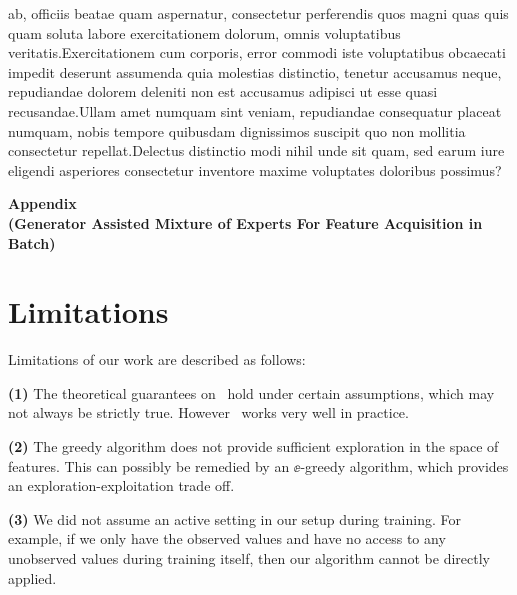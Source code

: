 \documentclass[letterpaper]{article}
\begin{document}
ab, officiis beatae quam aspernatur, consectetur perferendis quos magni quas quis quam soluta labore exercitationem dolorum, omnis voluptatibus veritatis.Exercitationem cum corporis, error commodi iste voluptatibus obcaecati impedit deserunt assumenda quia molestias distinctio, tenetur accusamus neque, repudiandae dolorem deleniti non est accusamus adipisci ut esse quasi recusandae.Ullam amet numquam sint veniam, repudiandae consequatur placeat numquam, nobis tempore quibusdam dignissimos suscipit quo non mollitia consectetur repellat.Delectus distinctio modi nihil unde sit quam, sed earum iure eligendi asperiores consectetur inventore maxime voluptates doloribus possimus?\clearpage



\appendix
\onecolumn

\begin{center}
    \Large { \bf Appendix \\
    \normalsize (Generator Assisted  Mixture of Experts   For Feature Acquisition in Batch)
    }
\end{center}

\section{Limitations}
\label{app:lim}
Limitations of our work are described as follows:

\textbf{(1)} The theoretical guarantees on \our\ hold under certain assumptions, which may not always be strictly true. However \our\ works very well in practice.

\textbf{(2)} The greedy algorithm does not provide sufficient exploration in the space of features. This can possibly be remedied by an $\ee$-greedy algorithm, which provides an exploration-exploitation trade off.

\textbf{(3)} We did not assume an active setting in our setup during training. For example, if we only have the observed values and have no access to any unobserved values during training itself, then our algorithm cannot be directly applied.
\end{document}
